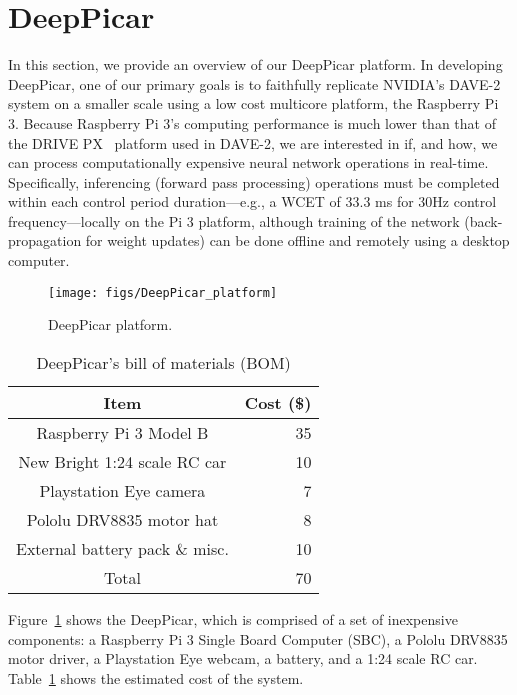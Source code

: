 
\section{DeepPicar}\label{sec:overview}

In this section, we provide an overview of our DeepPicar platform.
In developing DeepPicar, one of our primary goals is to faithfully
replicate NVIDIA's DAVE-2 system on a smaller scale using a low cost
multicore platform, the Raspberry Pi 3. Because Raspberry Pi 3's
computing performance is much lower than that of the DRIVE
PX~\cite{drivepx} platform used in DAVE-2, we are interested in if,
and how, we can process 
computationally expensive neural network operations in
real-time. Specifically, inferencing (forward pass processing)
operations must be completed within each control period
duration---e.g., a WCET of 33.3 ms for 30Hz control 
frequency---locally on the Pi 3 platform, although training of the 
network (back-propagation for weight updates) can be done offline and 
remotely using a desktop computer.

\begin{figure}[h]
  \centering
  \texttt{[image: figs/DeepPicar\_platform]}
  \caption{DeepPicar platform.}
  \label{fig:overview}
\end{figure}

\begin{table}[h]
  \centering
  \begin{tabular}{|c|r|}
    \hline
    Item                    & Cost (\$) \\
    \hline
    Raspberry Pi 3 Model B  & 35 \\
    New Bright 1:24 scale RC car       & 10 \\
    Playstation Eye camera  &  7 \\
    Pololu DRV8835 motor hat&  8 \\
    External battery pack \& misc.   & 10 \\
    \hline
    Total                   & 70 \\
    \hline
  \end{tabular}
  \caption{DeepPicar's bill of materials (BOM)}
  \label{tbl:carbom}
\end{table}

Figure~\ref{fig:overview} shows the DeepPicar, which is comprised of a
set of inexpensive components: a Raspberry Pi 3 Single Board Computer
(SBC), a Pololu DRV8835 motor driver, a Playstation Eye webcam, a
battery, and a 1:24 scale RC car. Table~\ref{tbl:carbom} shows the
estimated cost of the system.


